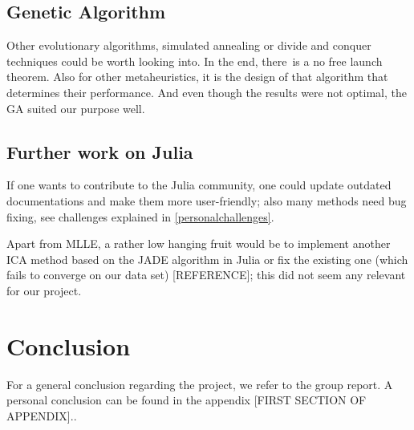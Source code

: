 \documentclass[journal, a4paper]{IEEEtran}
\begin{document}
\subsection{Genetic Algorithm}

Other evolutionary algorithms, simulated annealing or divide and conquer techniques could be worth looking into. In the end, there is a no free launch theorem. Also for other metaheuristics, it is the design of that algorithm that determines their performance. And even though the results were not optimal, the GA suited our purpose well.


\subsection{Further work on Julia}

If one wants to contribute to the Julia community, one could update outdated documentations and make them more user-friendly; also many methods need bug fixing, see challenges explained in \ref{personalchallenges}. 

Apart from MLLE, a rather low hanging fruit would be to implement another ICA method based on the JADE algorithm in Julia or fix the existing one (which fails to converge on our data set) [REFERENCE]; this did not seem any relevant for our project.


\section{Conclusion}
For a general conclusion regarding the project, we refer to the group report. A personal conclusion can be found in the appendix [FIRST SECTION OF APPENDIX]..

\newpage
\appendix 
\end{document}
